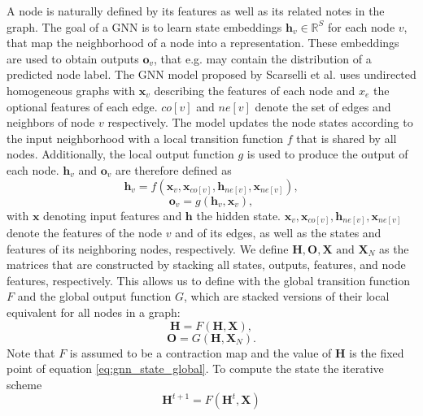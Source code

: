 A node is naturally defined by its features as well as its related notes in the graph. The goal of a GNN is to learn state embeddings $\mathbf{h}_v \in \mathbb{R}^S$ for each node $v$, that map the neighborhood of a node into a representation. These embeddings are used to obtain outputs $\mathbf{o}_v$, that e.g. may contain the distribution of a predicted node label. The GNN model proposed by Scarselli et al.\cite{4700287} uses undirected homogeneous graphs with $\mathbf{x}_v$ describing the features of each node and $x_e$ the optional features of each edge. $co[v]$ and $ne[v]$ denote the set of edges and neighbors of node $v$ respectively. The model updates the node states according to the input neighborhood with a local transition function $f$ that is shared by all nodes. Additionally, the local output function $g$ is used to produce the output of each node. $\mathbf{h}_v$ and $\mathbf{o}_v$ are therefore defined as
\begin{equation}
    \mathbf{h}_v = f(\mathbf{x}_v, \mathbf{x}_{co[v]}, \mathbf{h}_{ne[v]}, \mathbf{x}_{ne[v]}),
    \label{eq:gnn_state_local}
\end{equation}
\begin{equation}
    \mathbf{o}_v = g(\mathbf{h}_v, \mathbf{x}_v),
\end{equation}
with $\mathbf{x}$ denoting input features and $\mathbf{h}$ the hidden state. $\mathbf{x}_v, \mathbf{x}_{co[v]}, \mathbf{h}_{ne[v]}, \mathbf{x}_{ne[v]}$ denote the features of the node $v$ and of its edges, as well as the states and features of its neighboring nodes, respectively. We define $\mathbf{H}, \mathbf{O}, \mathbf{X} \text{ and  }\mathbf{X}_N$ as the matrices that are constructed by stacking all states, outputs, features, and node features, respectively. This allows us to define with the global transition function $F$ and the global output function $G$, which are stacked versions of their local equivalent for all nodes in a graph: 
\begin{equation}
    \mathbf{H} = F(\mathbf{H}, \mathbf{X}),
    \label{eq:gnn_state_global}
\end{equation}
\begin{equation}
    \mathbf{O} = G(\mathbf{H},\mathbf{X}_N).
\end{equation}
Note that $F$ is assumed to be a contraction map and the value of $\mathbf{H}$ is the fixed point of equation \eqref{eq:gnn_state_global}. To compute the state the iterative scheme
\begin{equation}
    \mathbf{H}^{t+1} = F(\mathbf{H}^t, \mathbf{X})
\end{equation}
